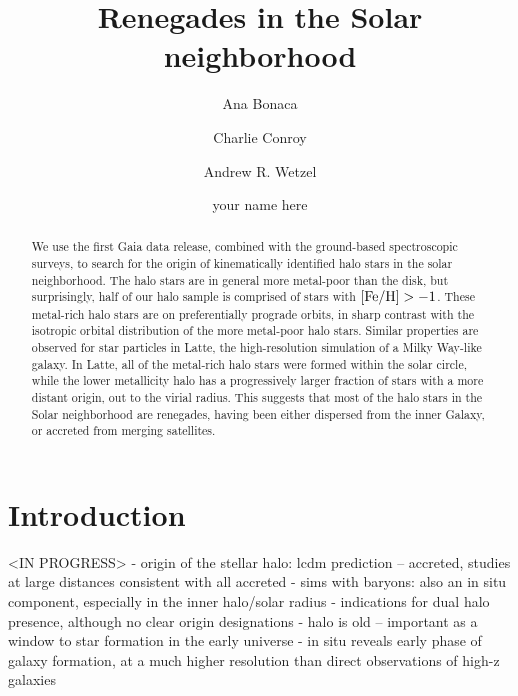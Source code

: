 \documentclass[apj, twocolappendix, numberedappendix, appendixfloats]{emulateapj}
\begin{document}
\title{Renegades in the Solar neighborhood}
\author{Ana Bonaca}
\author{Charlie Conroy}
\author{Andrew R. Wetzel}
\author{your name here}


\begin{abstract}
We use the first Gaia data release, combined with the ground-based spectroscopic surveys, to search for the origin of kinematically identified halo stars in the solar neighborhood.
The halo stars are in general more metal-poor than the disk, but surprisingly, half of our halo sample is comprised of stars with $\rm[Fe/H]>-1$.
These metal-rich halo stars are on preferentially prograde orbits, in sharp contrast with the isotropic orbital distribution of the more metal-poor halo stars.
Similar properties are observed for star particles in Latte, the high-resolution simulation of a Milky Way-like galaxy.
In Latte, all of the metal-rich halo stars were formed within the solar circle, while the lower metallicity halo has a progressively larger fraction of stars with a more distant origin, out to the virial radius.
This suggests that most of the halo stars in the Solar neighborhood are renegades, having been either dispersed from the inner Galaxy, or accreted from merging satellites.
\end{abstract}
\maketitle

\section{Introduction}
<IN PROGRESS>
- origin of the stellar halo: lcdm prediction -- accreted, studies at large distances consistent with all accreted
- sims with baryons: also an in situ component, especially in the inner halo/solar radius
- indications for dual halo presence, although no clear origin designations
- halo is old -- important as a window to star formation in the early universe
- in situ reveals early phase of galaxy formation, at a much higher resolution than direct observations of high-z galaxies
\end{document}
